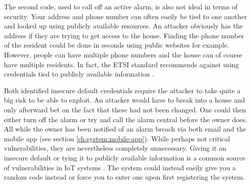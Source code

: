 The second code, used to call off an active alarm, is also not ideal in terms of security. Your address and phone number can often easily be tied to one another and looked up using publicly available resources. An attacker obviously has the address if they are trying to get access to the house. Finding the phone number of the resident could be done in seconds using public websites for example. However, people can have multiple phone numbers and the house can of course have multiple residents. In fact, the ETSI standard recommends against using credentials tied to publicly available information \cite{etsi-iot-standard}.

Both identified insecure default credentials require the attacker to take quite a big risk to be able to exploit. An attacker would have to break into a house and only afterward bet on the fact that these had not been changed. One could then either turn off the alarm or try and call the alarm central before the owner does. All while the owner has been notified of an alarm breach via both email and the mobile app (see section \ref{ch:system:mobile-app}). While perhaps not critical vulnerabilities, they are nevertheless completely unnecessary. Giving it an insecure default or tying it to publicly available information is a common source of vulnerabilities in IoT systems \cite{owasp-iot-top10, etsi-iot-standard}. The system could instead easily give you a random code instead or force you to enter one upon first registering the system.
